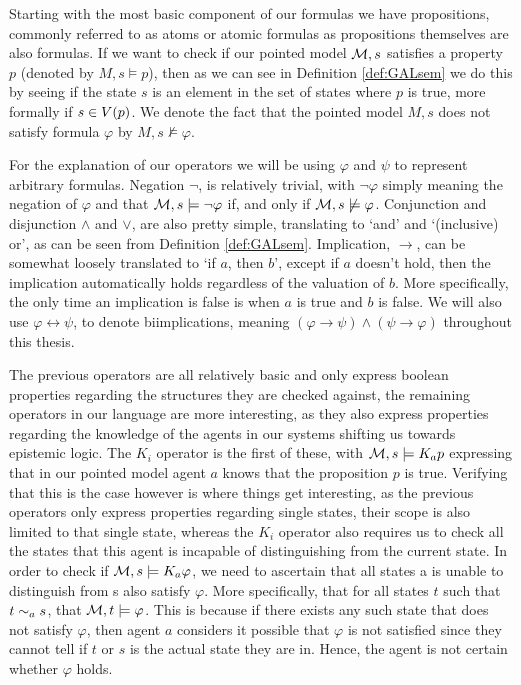 Starting with the most basic component of our formulas we have propositions, commonly referred to as atoms or atomic formulas as propositions themselves are also formulas. If we want to check if our pointed model $\mathcal{M},s$ satisfies a property $p$ (denoted by $M,s\models p$), then as we can see in Definition \ref{def:GALsem} we do this by seeing if the state $s$ is an element in the set of states where $p$ is true, more formally if $s \in V(p)$. We denote the fact that the pointed model $M,s$ does not satisfy formula $\varphi$ by $M,s \not\models\varphi$.

For the explanation of our operators we will be using $\varphi$ and $\psi$ to represent arbitrary formulas. Negation $\neg$, is relatively trivial, with $\neg\varphi$ simply meaning the negation of $\varphi$ and that $\mathcal{M},s \models \neg\varphi$ if, and only if $\mathcal{M},s \not\models\varphi$. Conjunction and disjunction $\wedge$ and $\vee$, are also pretty simple, translating to `and' and `(inclusive) or', as can be seen from Definition \ref{def:GALsem}. Implication, $\rightarrow$, can be somewhat loosely translated to `if $a$, then $b$', except if $a$ doesn't hold, then the implication automatically holds regardless of the valuation of $b$. More specifically, the only time an implication is false is when $a$ is true and $b$ is false. We will also use $\varphi \leftrightarrow \psi$, to denote biimplications, meaning $(\varphi \rightarrow \psi) \wedge (\psi \rightarrow \varphi)$ throughout this thesis. 

The previous operators are all relatively basic and only express boolean properties regarding the structures they are checked against, the remaining operators in our language are more interesting, as they also express properties regarding the knowledge of the agents in our systems shifting us towards epistemic logic. The $K_i$ operator is the first of these, with $\mathcal{M} ,s \models K_ap$ expressing that in our pointed model agent $a$ knows that the proposition $p$ is true. Verifying that this is the case however is where things get interesting, as the previous operators only express properties regarding single states, their scope is also limited to that single state, whereas the $K_i$ operator also requires us to check all the states that this agent is incapable of distinguishing from the current state. In order to check if $\mathcal{M},s \models K_a\varphi$, we need to ascertain that all states a is unable to distinguish from s also satisfy $\varphi$. More specifically, that for all states $t$ such that $t\sim_as$, that $\mathcal{M},t \models\varphi$. This is because if there exists any such state that does not satisfy $\varphi$, then agent $a$ considers it possible that $\varphi$ is not satisfied since they cannot tell if $t$ or $s$ is the actual state they are in. Hence, the agent is not certain whether $\varphi$ holds.

